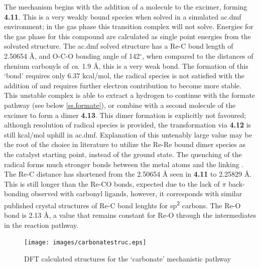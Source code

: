 The mechanism begins with the addition of a  molecule to the excimer, forming \textbf{4.11}. This is a very weakly bound species when solved in a simulated \gls{ac.dmf} environment; in the gas phase this transition complex will not solve. Energies for the gas phase for this compound are calculated as single point energies from the solvated structure. The \gls{ac.dmf} solved structure has a Re-C bond length of 2.50654 \r{A}, and O-C-O bonding angle of 142$^\circ$, when compared to the  distances of rhenium carbonyls of \textit{ca}. 1.9 \r{A}, this is a very weak bond. The formation of this `bond' requires only 6.37 kcal/mol, the radical species is not satisfied with the addition of  and requires further electron contribution to become more stable. This unstable complex is able to extract a hydrogen to continue with the formate pathway (see below \autoref{ss.formate}), or combine with a second molecule of the excimer to form a dimer \textbf{4.13}. This dimer formation is explicitly not favoured; although resolution of radical species is provided, the transformation via \textbf{4.12} is still  kcal/mol uphill in \gls{ac.dmf}. Explanation of this untenably large value may be the root of the choice in literature to utilize the Re-Re bound dimer species as the catalyst starting point, instead of the ground state.  The quenching of the radical forms much stronger bonds between the metal atoms and the linking . The Re-C distance has shortened from the 2.50654 \r{A} seen in \textbf{4.11} to 2.25829 \r{A}. This is still longer than the Re-CO bonds, expected due to the lack of $\pi$ back-bonding observed with carbonyl ligands, however, it corresponds with similar published crystal structures of Re-C bond lenghts for sp\textsuperscript{2} carbons\autocite{lukehart1977}. The Re-O bond is 2.13 \r{A}, a value that remains constant for Re-O through the intermediates in the reaction pathway.

\begin{figure}[!ht]
 \begin{center}
  \texttt{[image: images/carbonatestruc.eps]}
 \end{center}
\caption{DFT calculated structures for the `carbonate' mechanistic pathway}
\label{fig.carbonatestruc}
\end{figure} 

